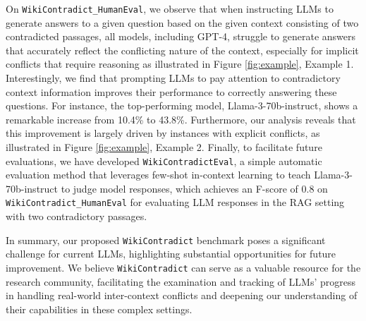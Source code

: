 On \texttt{WikiContradict\_HumanEval}, we observe that when instructing LLMs to generate answers to a given question based on the given context consisting of two contradicted passages, all
models, including GPT-4, struggle to generate answers that accurately reflect the conflicting nature of the context, especially for implicit conflicts that require reasoning as illustrated in Figure \ref {fig:example}, Example 1. Interestingly, we find that prompting LLMs to pay attention to contradictory context information improves their performance to correctly answering these questions. For instance, 
the top-performing model, Llama-3-70b-instruct, shows a remarkable increase from 10.4\% to 43.8\%. Furthermore, our analysis reveals that this improvement is largely driven by instances with explicit conflicts, as illustrated in Figure \ref{fig:example}, Example 2. Finally, to facilitate future evaluations, we have developed \texttt{WikiContradictEval}, a simple automatic evaluation method that leverages few-shot in-context learning to teach Llama-3-70b-instruct to judge model responses, which achieves an F-score of 0.8 on \texttt{WikiContradict\_HumanEval} for evaluating LLM responses in the RAG setting with two contradictory passages.

 In summary, our proposed \texttt{WikiContradict} benchmark poses a significant challenge for current LLMs, highlighting substantial opportunities for future improvement. We believe \texttt{WikiContradict} can serve as a valuable resource for the research community, facilitating the examination and tracking of LLMs' progress in handling real-world inter-context conflicts and deepening our understanding of their capabilities in these complex settings.








